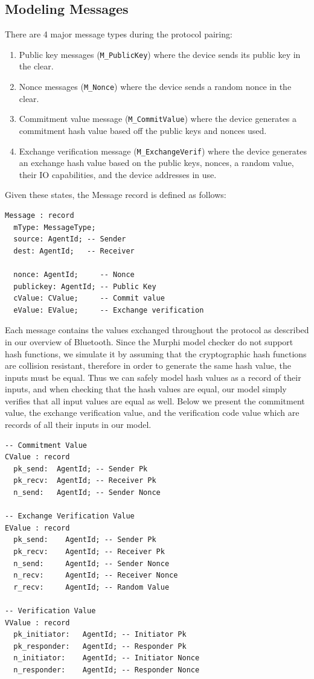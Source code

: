 \documentclass{acm_proc_article-sp}
\begin{document}
\subsection{Modeling Messages}
There are 4 major message types during the protocol pairing: 

\begin{enumerate}[1.]
    \item Public key messages (\texttt{M\_PublicKey}) where the device sends its public key in the clear.
    \item Nonce messages (\texttt{M\_Nonce}) where the device sends a random nonce in the clear.
    \item Commitment value message (\texttt{M\_CommitValue}) where the device generates a commitment hash value based off the public keys and nonces used.
    \item Exchange verification message (\texttt{M\_ExchangeVerif}) where the device generates an exchange hash value based on the public keys, nonces, a random value, their IO capabilities, and the device addresses in use.
\end{enumerate}

Given these states, the Message record is defined as follows:

\begin{verbatim}
Message : record
  mType: MessageType;
  source: AgentId; -- Sender
  dest: AgentId;   -- Receiver
  
  nonce: AgentId;     -- Nonce
  publickey: AgentId; -- Public Key
  cValue: CValue;     -- Commit value
  eValue: EValue;     -- Exchange verification
\end{verbatim}

Each message contains the values exchanged throughout the protocol as described in our overview of Bluetooth. Since the Murphi model checker do not support hash functions, we simulate it by assuming that the cryptographic hash functions are collision resistant, therefore in order to generate the same hash value, the inputs must be equal. Thus we can safely model hash values as a record of their inputs, and when checking that the hash values are equal, our model simply verifies that all input values are equal as well. Below we present the commitment value, the exchange verification value, and the verification code value which are records of all their inputs in our model.

\begin{verbatim}
-- Commitment Value
CValue : record
  pk_send:  AgentId; -- Sender Pk
  pk_recv:  AgentId; -- Receiver Pk
  n_send:   AgentId; -- Sender Nonce

-- Exchange Verification Value
EValue : record
  pk_send:    AgentId; -- Sender Pk
  pk_recv:    AgentId; -- Receiver Pk
  n_send:     AgentId; -- Sender Nonce
  n_recv:     AgentId; -- Receiver Nonce
  r_recv:     AgentId; -- Random Value

-- Verification Value
VValue : record
  pk_initiator:   AgentId; -- Initiator Pk
  pk_responder:   AgentId; -- Responder Pk
  n_initiator:    AgentId; -- Initiator Nonce
  n_responder:    AgentId; -- Responder Nonce
\end{verbatim}
\end{document}
